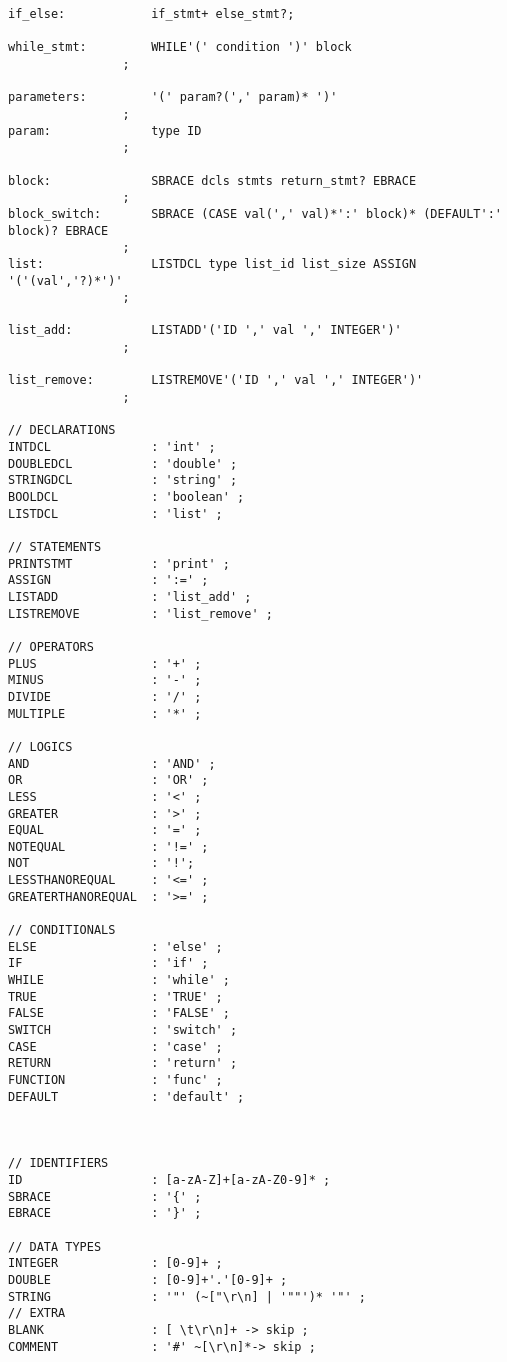 \begin{verbatim}
if_else:            if_stmt+ else_stmt?;

while_stmt:         WHILE'(' condition ')' block
                ;

parameters:         '(' param?(',' param)* ')'
                ;
param:              type ID
                ;

block:              SBRACE dcls stmts return_stmt? EBRACE
                ;
block_switch:       SBRACE (CASE val(',' val)*':' block)* (DEFAULT':' block)? EBRACE
                ;
list:               LISTDCL type list_id list_size ASSIGN '('(val','?)*')'
                ;

list_add:           LISTADD'('ID ',' val ',' INTEGER')'
                ;

list_remove:        LISTREMOVE'('ID ',' val ',' INTEGER')'
                ;

// DECLARATIONS
INTDCL              : 'int' ;
DOUBLEDCL           : 'double' ;
STRINGDCL           : 'string' ;
BOOLDCL             : 'boolean' ;
LISTDCL             : 'list' ;

// STATEMENTS
PRINTSTMT           : 'print' ;
ASSIGN              : ':=' ;
LISTADD             : 'list_add' ;
LISTREMOVE          : 'list_remove' ;

// OPERATORS
PLUS                : '+' ;
MINUS               : '-' ;
DIVIDE              : '/' ;
MULTIPLE            : '*' ;

// LOGICS
AND                 : 'AND' ;
OR                  : 'OR' ;
LESS                : '<' ;
GREATER             : '>' ;
EQUAL               : '=' ;
NOTEQUAL            : '!=' ;
NOT                 : '!';
LESSTHANOREQUAL     : '<=' ;
GREATERTHANOREQUAL  : '>=' ;

// CONDITIONALS
ELSE                : 'else' ;
IF                  : 'if' ;
WHILE               : 'while' ;
TRUE                : 'TRUE' ;
FALSE               : 'FALSE' ;
SWITCH              : 'switch' ;
CASE                : 'case' ;
RETURN              : 'return' ;
FUNCTION            : 'func' ;
DEFAULT             : 'default' ;



// IDENTIFIERS
ID                  : [a-zA-Z]+[a-zA-Z0-9]* ;
SBRACE              : '{' ;
EBRACE              : '}' ;

// DATA TYPES
INTEGER             : [0-9]+ ;
DOUBLE              : [0-9]+'.'[0-9]+ ;
STRING              : '"' (~["\r\n] | '""')* '"' ;
// EXTRA
BLANK               : [ \t\r\n]+ -> skip ;
COMMENT             : '#' ~[\r\n]*-> skip ;
\end{verbatim}
    